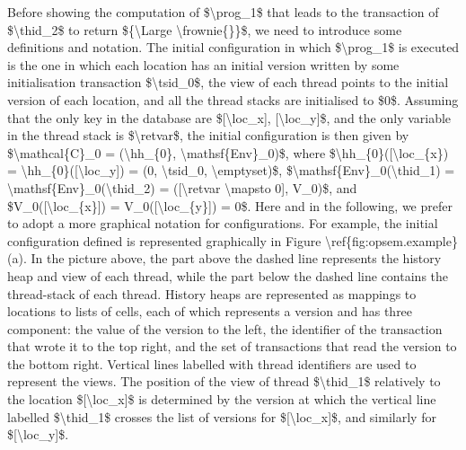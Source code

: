 \ac{
Before showing the computation of $\prog_1$ that leads to the transaction of 
$\thid_2$ to return ${\Large \frownie{}}$, we need to introduce some 
definitions and  notation.
The initial configuration in which $\prog_1$ is executed is the one in which 
each location has an initial version written by some initialisation transaction $\tsid_0$, 
the view of each thread points to the initial version of each location, and all the  
thread stacks are initialised to $0$. Assuming that the only key in the database 
are $[\loc_x], [\loc_y]$, and the only variable in the thread stack is $\retvar$, 
the initial configuration is then given by $\mathcal{C}_0 = (\hh_{0}, \mathsf{Env}_0)$, 
where $\hh_{0}([\loc_{x}) = \hh_{0}([\loc_y]) =  (0, \tsid_0, \emptyset)$,  
$\mathsf{Env}_0(\thid_1) = \mathsf{Env}_0(\thid_2) = ([\retvar \mapsto 0], V_0)$, 
and $V_0([\loc_{x}]) = V_0([\loc_{y}]) = 0$. Here and in the following, we prefer 
to adopt a more graphical notation for configurations. For example, the initial configuration 
defined is represented graphically in Figure \ref{fig:opsem.example}(a). 

In the picture above, the part above the dashed line represents the history heap and 
view of each thread, while the part below the dashed line contains the thread-stack 
of each thread. History heaps are represented as mappings to locations to lists of cells, 
each of which represents a version and has three component: the value of the version 
to the left, the identifier of the transaction that wrote it to the top right, and the 
set of transactions that read the version to the bottom right. Vertical lines labelled 
with thread identifiers are used to represent the views. The position of the view of 
thread $\thid_1$ relatively to the location $[\loc_x]$ is determined by the version 
at which the vertical line labelled $\thid_1$ crosses the list of versions for $[\loc_x]$,
 and similarly for $[\loc_y]$.
}

